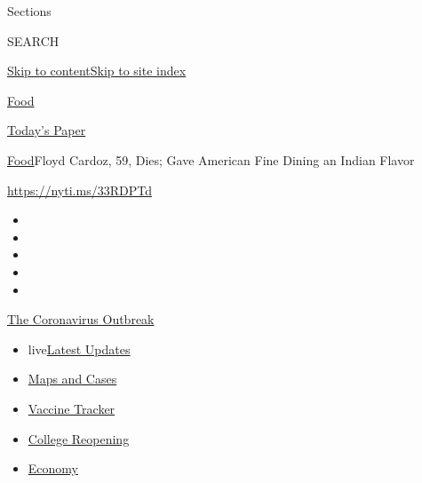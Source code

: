 Sections

SEARCH

\protect\hyperlink{site-content}{Skip to
content}\protect\hyperlink{site-index}{Skip to site index}

\href{https://www.nytimes3xbfgragh.onion/section/food}{Food}

\href{https://myaccount.nytimes3xbfgragh.onion/auth/login?response_type=cookie\&client_id=vi}{}

\href{https://www.nytimes3xbfgragh.onion/section/todayspaper}{Today's
Paper}

\href{/section/food}{Food}\textbar{}Floyd Cardoz, 59, Dies; Gave
American Fine Dining an Indian Flavor

\url{https://nyti.ms/33RDPTd}

\begin{itemize}
\item
\item
\item
\item
\item
\end{itemize}

\href{https://www.nytimes3xbfgragh.onion/news-event/coronavirus?action=click\&pgtype=Article\&state=default\&region=TOP_BANNER\&context=storylines_menu}{The
Coronavirus Outbreak}

\begin{itemize}
\tightlist
\item
  live\href{https://www.nytimes3xbfgragh.onion/2020/08/04/world/coronavirus-covid-19.html?action=click\&pgtype=Article\&state=default\&region=TOP_BANNER\&context=storylines_menu}{Latest
  Updates}
\item
  \href{https://www.nytimes3xbfgragh.onion/interactive/2020/us/coronavirus-us-cases.html?action=click\&pgtype=Article\&state=default\&region=TOP_BANNER\&context=storylines_menu}{Maps
  and Cases}
\item
  \href{https://www.nytimes3xbfgragh.onion/interactive/2020/science/coronavirus-vaccine-tracker.html?action=click\&pgtype=Article\&state=default\&region=TOP_BANNER\&context=storylines_menu}{Vaccine
  Tracker}
\item
  \href{https://www.nytimes3xbfgragh.onion/2020/08/02/us/covid-college-reopening.html?action=click\&pgtype=Article\&state=default\&region=TOP_BANNER\&context=storylines_menu}{College
  Reopening}
\item
  \href{https://www.nytimes3xbfgragh.onion/live/2020/08/03/business/stock-market-today-coronavirus?action=click\&pgtype=Article\&state=default\&region=TOP_BANNER\&context=storylines_menu}{Economy}
\end{itemize}

